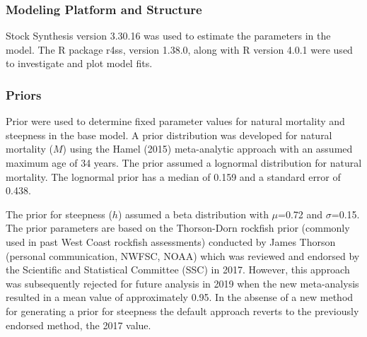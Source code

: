 \documentclass[11pt,
  english,
  a4paper,
]{article}
\begin{document}
\leavevmode\tagmcend\tagstructend\par


\hypertarget{modeling-platform-and-structure}{%
\subsubsection{Modeling Platform and Structure}\label{modeling-platform-and-structure}}

\leavevmode\tagmcend\tagstructend


Stock Synthesis version 3.30.16 was used to estimate the parameters in the model. The R package r4ss, version 1.38.0, along with R version 4.0.1 were used to investigate and plot model fits.

\leavevmode\tagmcend\tagstructend\par


\hypertarget{priors}{%
\subsubsection{Priors}\label{priors}}

\leavevmode\tagmcend\tagstructend


Prior were used to determine fixed parameter values for natural mortality and steepness in the base model. A prior distribution was developed for natural mortality ({\(M\)\leavevmode\tagmcend\tagstructend}) using the Hamel {(2015)\leavevmode\tagmcend\tagstructend} meta-analytic approach with an assumed maximum age of 34 years. The prior assumed a lognormal distribution for natural mortality. The lognormal prior has a median of 0.159 and a standard error of 0.438.

\leavevmode\tagmcend\tagstructend\par


The prior for steepness ({\(h\)\leavevmode\tagmcend\tagstructend}) assumed a beta distribution with {\(\mu\)\leavevmode\tagmcend\tagstructend}=0.72 and {\(\sigma\)\leavevmode\tagmcend\tagstructend}=0.15.\\
The prior parameters are based on the Thorson-Dorn rockfish prior (commonly used in past West Coast rockfish assessments) conducted by James Thorson (personal communication, NWFSC, NOAA) which was reviewed and endorsed by the Scientific and Statistical Committee (SSC) in 2017. However, this approach was subsequently rejected for future analysis in 2019 when the new meta-analysis resulted in a mean value of approximately 0.95. In the absense of a new method for generating a prior for steepness the default approach reverts to the previously endorsed method, the 2017 value.
\end{document}
